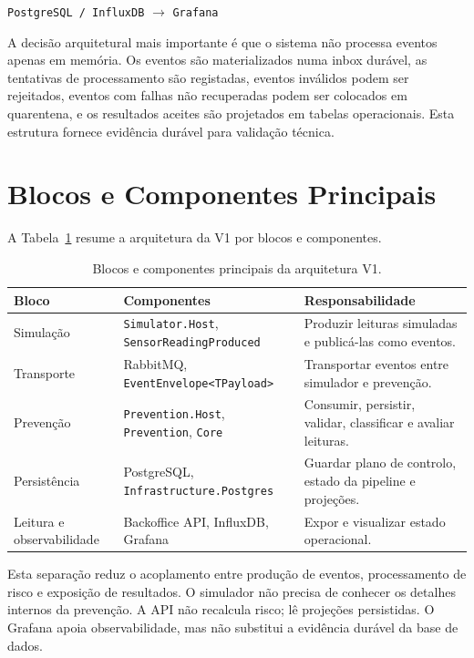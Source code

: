 \begin{center}
\texttt{PostgreSQL / InfluxDB} $\rightarrow$ \texttt{Grafana}
\end{center}

A decisão arquitetural mais importante é que o sistema não processa eventos apenas em memória. Os eventos são materializados numa inbox durável, as tentativas de processamento são registadas, eventos inválidos podem ser rejeitados, eventos com falhas não recuperadas podem ser colocados em quarentena, e os resultados aceites são projetados em tabelas operacionais. Esta estrutura fornece evidência durável para validação técnica.

\section{Blocos e Componentes Principais}

A Tabela~\ref{tab:architecture-components} resume a arquitetura da V1 por blocos e componentes.

\begin{table}[h]
\centering
\caption{Blocos e componentes principais da arquitetura V1.}
\label{tab:architecture-components}
\begin{tabular}{p{} p{} p{}}
\hline
\textbf{Bloco} & \textbf{Componentes} & \textbf{Responsabilidade} \\
\hline
Simulação & \texttt{Simulator.Host}, \texttt{SensorReadingProduced} & Produzir leituras simuladas e publicá-las como eventos. \\
Transporte & RabbitMQ, \texttt{EventEnvelope<TPayload>} & Transportar eventos entre simulador e prevenção. \\
Prevenção & \texttt{Prevention.Host}, \texttt{Prevention}, \texttt{Core} & Consumir, persistir, validar, classificar e avaliar leituras. \\
Persistência & PostgreSQL, \texttt{Infrastructure.Postgres} & Guardar plano de controlo, estado da pipeline e projeções. \\
Leitura e observabilidade & Backoffice API, InfluxDB, Grafana & Expor e visualizar estado operacional. \\
\hline
\end{tabular}
\end{table}

Esta separação reduz o acoplamento entre produção de eventos, processamento de risco e exposição de resultados. O simulador não precisa de conhecer os detalhes internos da prevenção. A API não recalcula risco; lê projeções persistidas. O Grafana apoia observabilidade, mas não substitui a evidência durável da base de dados.

